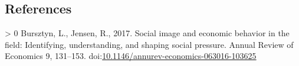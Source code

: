 \documentclass[ review  , 3p ]{elsarticle}
\newlength{\cslhangindent}
\newenvironment{CSLReferences}[3] %
 {%
  \setlength{\parindent}{0pt}
  \ifodd #1 \everypar{\setlength{\hangindent}{\cslhangindent}}\ignorespaces\fi
  \ifnum #2 > 0
  \setlength{\parskip}{#2\baselineskip}
  \fi
 }%
 {}
\begin{document}
  \hypertarget{references}{%
  \subsection*{References}\label{references}}

  \hypertarget{refs}{}
  \begin{CSLReferences}{1}{0}
  \leavevmode\hypertarget{ref-Bursztyn2017}{}%
  Bursztyn, L., Jensen, R., 2017. Social image and economic behavior in the field: Identifying, understanding, and shaping social pressure. Annual Review of Economics 9, 131--153. doi:\href{https://doi.org/10.1146/annurev-economics-063016-103625}{10.1146/annurev-economics-063016-103625}

  \end{CSLReferences}
\end{document}
